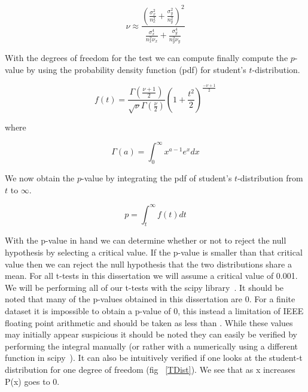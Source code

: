 	\begin{equation}\label{tTestDegrees}
		\nu \approx \frac{ (\frac{\sigma_{x}^2}{n_{x}^2}+\frac{\sigma_{y}^2}{n_{y}^2})^2 }{\frac{\sigma_{x}^4}{n_{x}^2 \nu_x}+\frac{\sigma_{y}^4}{n_{y}^2 \nu_y}}
	\end{equation}

With the degrees of freedom for the test we can compute finally compute the $p$-value by using the probability density function (pdf) for student's $t$-distribution. 

\begin{equation}\label{tTestPDF}
	f(t)=\frac{\Gamma(\frac{\nu+1}{2})}{\sqrt{\nu}\Gamma(\frac{\nu}{2})}(1+\frac{t^2}{2})^{\frac{-\nu+1}{2}}
\end{equation}

where 

\begin{equation}\label{Gamma}
	\Gamma(a) = \int_{0}^{\infty} x^{a-1}e^{x}dx
\end{equation}

We now obtain the $p$-value by integrating the pdf of student's $t$-distribution from $t$ to $\infty$. 

\begin{equation}\label{pvalStudentTest}
	p=\int_{t}^{\infty}f(t)dt 
\end{equation}

With the p-value in hand we can determine whether or not to reject the null hypothesis by selecting a critical value. If the p-value is smaller than that critical value then we can reject the null hypothesis that the two distributions share a mean.  For all t-tests in this dissertation we will assume a critical value of 0.001. We will be performing all of our t-tests with the scipy library~\cite{jones_scipy:_2001}. It should be noted that many of the p-values obtained in this dissertation are 0. For a finite dataset it is impossible to obtain a p-value of 0, this instead a limitation of IEEE floating point arithmetic and should be taken as less than  . While these values may initially appear suspicious it should be noted they can easily be verified by performing the integral manually (or rather with a numerically using a different function in scipy~\cite{jones_scipy:_2001}).  It can also be intuitively verified if one looks at the student-t distribution for one degree of freedom (fig ~\ref{TDist}).  We see that as x increases P(x) goes to 0.  

